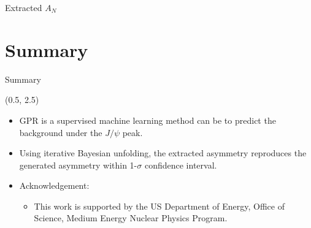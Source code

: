 \documentclass[10pt, xcolor={dvipsnames}, aspectratio = 169]{beamer}
\newcommand{\jpsi}{$J/\psi$ }
\begin{document}
\begin{frame}{Extracted $A_{N}$}
\end{frame}

%
%
\section{Summary}

\begin{frame}{Summary}

\begin{textblock}{15.0}(0.5, 2.5)

\begin{itemize}

\item GPR is a supervised machine learning method can be to predict the background under the \jpsi peak.

\item Using iterative Bayesian unfolding, the extracted asymmetry reproduces the generated asymmetry within 1-$\sigma$
confidence interval.

\item Acknowledgement:

\begin{itemize}
    \item This work is supported by the US Department of Energy, Office of Science, Medium Energy Nuclear Physics Program.
\end{itemize}

\end{itemize}

\end{textblock}

\end{frame}
\end{document}
